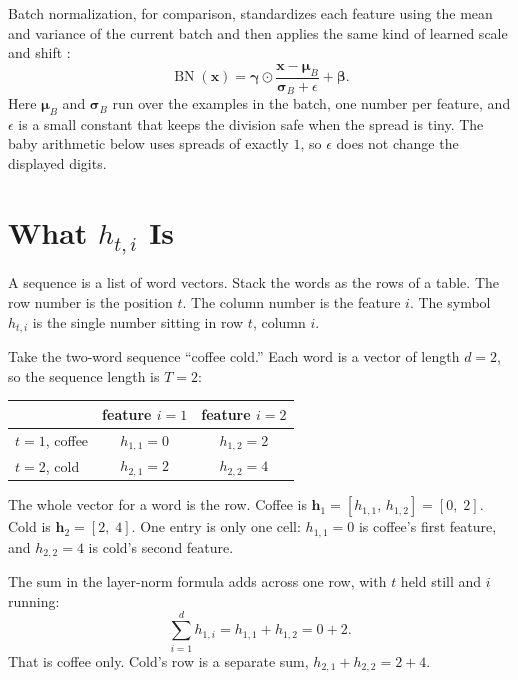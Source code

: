 \documentclass[11pt]{article}
\begin{document}
Batch normalization, for comparison, standardizes each feature using the
mean and variance of the current batch and then applies the same kind of
learned scale and shift \cite{ioffe2015batch}:
\[
  \operatorname{BN}(\mathbf{x})
  =
  \boldsymbol{\gamma}
  \odot
  \frac{\mathbf{x}-\boldsymbol{\mu}_B}{\boldsymbol{\sigma}_B+\epsilon}
  +
  \boldsymbol{\beta}.
\]
Here \(\boldsymbol{\mu}_B\) and \(\boldsymbol{\sigma}_B\) run over the
examples in the batch, one number per feature, and \(\epsilon\) is a small
constant that keeps the division safe when the spread is tiny. The baby
arithmetic below uses spreads of exactly \(1\), so \(\epsilon\) does not
change the displayed digits.

\section{What \(h_{t,i}\) Is}
\label{sec:hti}

A sequence is a list of word vectors. Stack the words as the rows of a
table. The row number is the position \(t\). The column number is the
feature \(i\). The symbol \(h_{t,i}\) is the single number sitting in row
\(t\), column \(i\).

Take the two-word sequence ``coffee cold.'' Each word is a vector of length
\(d=2\), so the sequence length is \(T=2\):

\begin{center}
\begin{tabular}{@{}lcc@{}}
\toprule
 & feature \(i=1\) & feature \(i=2\) \\
\midrule
\(t=1\), coffee & \(h_{1,1}=0\) & \(h_{1,2}=2\) \\
\(t=2\), cold & \(h_{2,1}=2\) & \(h_{2,2}=4\) \\
\bottomrule
\end{tabular}
\end{center}

The whole vector for a word is the row. Coffee is
\(\mathbf{h}_1 = [h_{1,1},\, h_{1,2}] = [0,\; 2]\).
Cold is \(\mathbf{h}_2 = [2,\; 4]\).
One entry is only one cell: \(h_{1,1}=0\) is coffee's first feature, and
\(h_{2,2}=4\) is cold's second feature.

The sum in the layer-norm formula adds across one row, with \(t\) held
still and \(i\) running:
\[
  \sum_{i=1}^{d} h_{1,i}
  =
  h_{1,1}+h_{1,2}
  =
  0+2.
\]
That is coffee only. Cold's row is a separate sum,
\(h_{2,1}+h_{2,2}=2+4\).
\end{document}
